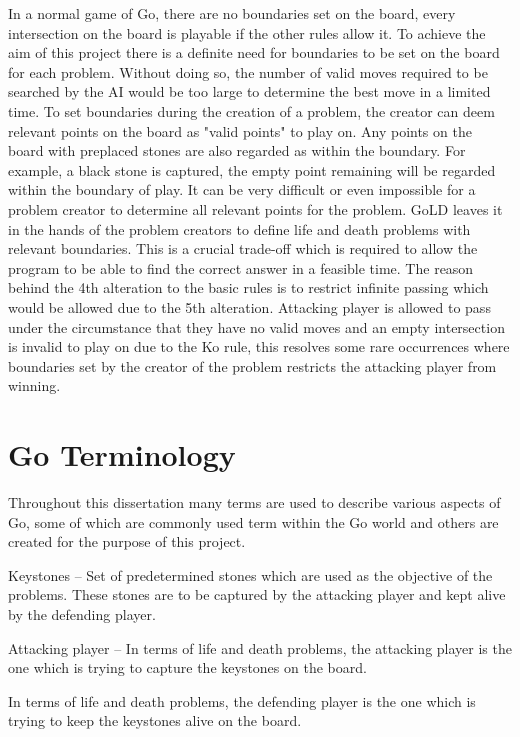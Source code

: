 \documentclass{l4proj}
\begin{document}
\bigskip
In a normal game of Go, there are no boundaries set on the board, every intersection on the board is playable if the other rules allow it. To achieve the aim of this project there is a definite need for boundaries to be set on the board for each problem. Without doing so, the number of valid moves required to be searched by the AI would be too large to determine the best move in a limited time. To set boundaries during the creation of a problem, the creator can deem relevant points on the board as "valid points" to play on. Any points on the board with preplaced stones are also regarded as within the boundary. For example, a black stone is captured, the empty point remaining will be regarded within the boundary of play. It can be very difficult or even impossible for a problem creator to determine all relevant points for the problem. GoLD leaves it in the hands of the problem creators to define life and death problems with relevant boundaries. This is a crucial trade-off which is required to allow the program to be able to find the correct answer in a feasible time.
The reason behind the 4th alteration to the basic rules is to restrict infinite passing which would be allowed due to the 5th alteration. Attacking player is allowed to pass under the circumstance that they have no valid moves and an empty intersection is invalid to play on due to the Ko rule, this resolves some rare occurrences where boundaries set by the creator of the problem restricts the attacking player from winning.




\section{Go Terminology}

Throughout this dissertation many terms are used to describe various aspects of Go, some of which are commonly used term within the Go world and others are created for the purpose of this project.

Keystones – Set of predetermined stones which are used as the objective of the problems. These stones are to be captured by the attacking player and kept alive by the defending player.

Attacking player – In terms of life and death problems, the attacking player is the one which is trying to capture the keystones on the board.

In terms of life and death problems, the defending player is the one which is trying to keep the keystones alive on the board.
\end{document}

